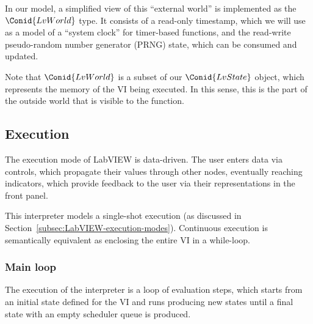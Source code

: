In our model, a simplified view of this ``external world'' is implemented as
the \ensuremath{\Conid{LvWorld}} type. It consists of a read-only timestamp, which we will use as
a model of a ``system clock'' for timer-based functions, and the read-write
pseudo-random number generator (PRNG) state, which can be consumed and
updated.

\resethooks

Note that \ensuremath{\Conid{LvWorld}} is a subset of our \ensuremath{\Conid{LvState}} object, which represents the
memory of the VI being executed. In this sense, this is the part of the
outside world that is visible to the function.

\subsection{Execution}

The execution mode of LabVIEW is data-driven. The user enters data via
controls, which propagate their values through other nodes, eventually
reaching indicators, which provide feedback to the user via their
representations in the front panel.

This interpreter models a single-shot execution (as discussed in
Section~\ref{subsec:LabVIEW-execution-modes}). Continuous execution is
semantically equivalent as enclosing the entire VI in a while-loop.

\subsubsection{Main loop}

The execution of the interpreter is a loop of evaluation steps, which starts
from an initial state defined for the VI and runs producing new states until a
final state with an empty scheduler queue is produced.

